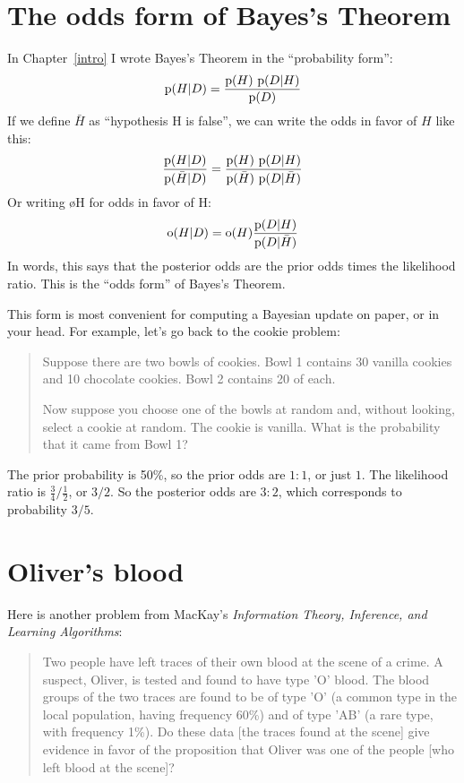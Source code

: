\documentclass[12pt]{book}
\begin{document}
\section{The odds form of Bayes's Theorem}

In Chapter~\ref{intro} I wrote Bayes's Theorem in the ``probability
form'':
%
\[ \mathrm{p}(H|D) = \frac{\mathrm{p}(H)~\mathrm{p}(D|H)}{\mathrm{p}(D)} \]
%
If we define $\bar{H}$ as ``hypothesis H is false'', we can write the
odds in favor of $H$ like this:
%
\[ \frac{\mathrm{p}(H|D)}{\mathrm{p}(\bar{H}|D)} = \frac{\mathrm{p}(H)~\mathrm{p}(D|H)}
                                        {\mathrm{p}(\bar{H})~\mathrm{p}(D|\bar{H})} \]
%
Or writing \o{H} for odds in favor of H:
%
\[ \mathrm{o}(H|D) = \mathrm{o}(H) \frac{\mathrm{p}(D|H)}{\mathrm{p}(D|\bar{H})} \]
%
In words, this says that the posterior odds are the prior odds times
the likelihood ratio.  This is the ``odds form'' of Bayes's Theorem.

This form is most convenient for computing a Bayesian update on
paper, or in your head.  For example, let's go back to the
cookie problem:

\begin{quote}
Suppose there are two bowls of cookies.  Bowl 1 contains
  30 vanilla cookies and 10 chocolate cookies.  Bowl 2 contains 20 of
  each.

Now suppose you choose one of the bowls at random and, without looking,
select a cookie at random.  The cookie is vanilla.  What is the probability
that it came from Bowl 1?
\end{quote}

The prior probability is 50\%, so the prior odds are $1:1$, or just
$1$.  The likelihood ratio is $\frac{3}{4} / \frac{1}{2}$, or $3/2$.
So the posterior odds are $3:2$, which corresponds to probability
$3/5$.


\section{Oliver's blood}
\label{evidence}

Here is another problem from MacKay's {\it Information Theory,
  Inference, and Learning Algorithms}:

\begin{quote}
Two people have left traces of their own blood at the scene of
a crime.  A suspect, Oliver, is tested and found to have type
'O' blood.  The blood groups of the two traces are found to
be of type 'O' (a common type in the local population, having frequency
60\%) and of type 'AB' (a rare type, with frequency 1\%).
Do these data [the traces found at the scene] give evidence
in favor of the proposition that Oliver was one of the people
[who left blood at the scene]?
\end{quote}
\end{document}
